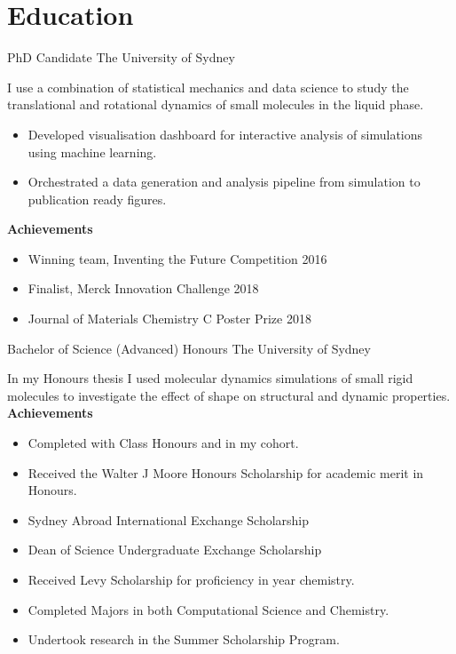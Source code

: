 



\makecvtitle{}

\vspace{-4em}
\section{Education}

{PhD Candidate}
{The University of Sydney}{}{}
{%
  I use a combination of statistical mechanics and data science to
  study the translational and rotational dynamics
  of small molecules in the liquid phase.
\begin{itemize}
  \item Developed visualisation dashboard for interactive analysis of simulations
    using machine learning.
  \item Orchestrated a data generation and analysis pipeline from simulation to
    publication ready figures.
\end{itemize}
\textbf{Achievements}
\begin{itemize}
  \item Winning team, Inventing the Future Competition 2016
  \item Finalist, Merck Innovation Challenge 2018
  \item Journal of Materials Chemistry C Poster Prize 2018
\end{itemize}
}
\vspace{1em}

{Bachelor of Science (Advanced) Honours}
{The University of Sydney}{}{}
{%
  In my Honours thesis
  I used molecular dynamics simulations of small rigid molecules
  to investigate the effect of shape on structural and dynamic properties.\\
\textbf{Achievements}
\begin{itemize}
  \item Completed with  Class Honours and  in my cohort.
  \item Received the Walter J Moore Honours Scholarship for academic merit in Honours.
  \item Sydney Abroad International Exchange Scholarship
  \item Dean of Science Undergraduate Exchange Scholarship
  \item Received Levy Scholarship for proficiency in  year chemistry.
  \item Completed Majors in both Computational Science and Chemistry.
  \item Undertook research in the Summer Scholarship Program.
\end{itemize}
}
\vspace{1em}

